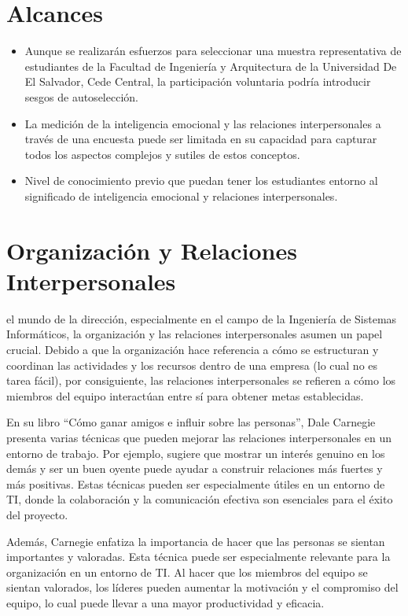 \documentclass[journal]{IEEEtran}
\begin{document}
\section{Alcances}
\begin{itemize}
	\item Aunque se realizarán esfuerzos para seleccionar una muestra representativa de estudiantes de la Facultad de Ingeniería y Arquitectura de la Universidad De El Salvador, Cede Central, la participación voluntaria podría introducir sesgos de autoselección.
	\item La medición de la inteligencia emocional y las relaciones interpersonales a través de una encuesta puede ser limitada en su capacidad para capturar todos los aspectos complejos y sutiles de estos conceptos.
	\item Nivel de conocimiento previo que puedan tener los estudiantes entorno al significado de inteligencia emocional y relaciones interpersonales. 
\end{itemize}
\section{Organización y Relaciones Interpersonales}
 el mundo de la dirección, especialmente en el campo de la Ingeniería de Sistemas Informáticos, la organización y las relaciones interpersonales asumen un papel crucial. Debido a que la organización hace referencia a cómo se estructuran y coordinan las actividades y los recursos dentro de una empresa (lo cual no es tarea fácil), por consiguiente, las relaciones interpersonales se refieren a cómo los miembros del equipo interactúan entre sí para obtener metas establecidas.

En su libro “Cómo ganar amigos e influir sobre las personas”, Dale Carnegie presenta varias técnicas que pueden mejorar las relaciones interpersonales en un entorno de trabajo. Por ejemplo, sugiere que mostrar un interés genuino en los demás y ser un buen oyente puede ayudar a construir relaciones más fuertes y más positivas. Estas técnicas pueden ser especialmente útiles en un entorno de TI, donde la colaboración y la comunicación efectiva son esenciales para el éxito del proyecto.

Además, Carnegie enfatiza la importancia de hacer que las personas se sientan importantes y valoradas. Esta técnica puede ser especialmente relevante para la organización en un entorno de TI. Al hacer que los miembros del equipo se sientan valorados, los líderes pueden aumentar la motivación y el compromiso del equipo, lo cual puede llevar a una mayor productividad y eficacia.
\end{document}
